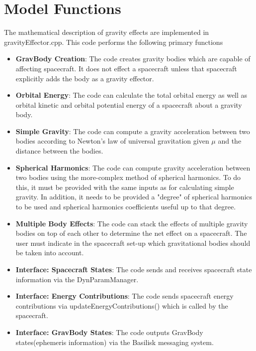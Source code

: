 \section{Model Functions}
The mathematical description of gravity effects are implemented in gravityEffector.cpp. This code performs the following primary functions
\begin{itemize}
	\item \textbf{GravBody Creation}: The code creates gravity bodies which are capable of affecting spacecraft. It does not effect a spacecraft unless that spacecraft explicitly adds the body as a gravity effector.
	\item \textbf{Orbital Energy}: The code can calculate the total orbital energy as well as orbital kinetic and orbital potential energy of a spacecraft about a gravity body.
	\item \textbf{Simple Gravity}: The code can compute a gravity acceleration between two bodies according to Newton's law of universal gravitation given $\mu$ and the distance between the bodies.
	\item \textbf{Spherical Harmonics}: The code can compute gravity acceleration between two bodies using the more-complex method of spherical harmonics. To do this, it must be provided with the same inputs as for calculating simple gravity. In addition, it needs to be provided a "degree" of spherical harmonics to be used and spherical harmonics coefficients useful up to that degree.
	\item \textbf{Multiple Body Effects}: The code can stack the effects of multiple gravity bodies on top of each other to determine the net effect on a spacecraft. The user must indicate in the spacecraft set-up which gravitational bodies should be taken into account.
	\item \textbf{Interface: Spacecraft States}: The code sends and receives spacecraft state information via the DynParamManager.
	\item \textbf{Interface: Energy Contributions}: The code sends spacecraft energy contributions via updateEnergyContributions() which is called by the spacecraft.
	\item \textbf{Interface: GravBody States}: The code outputs GravBody states(ephemeris information) via the Basilisk messaging system.
	
\end{itemize}
